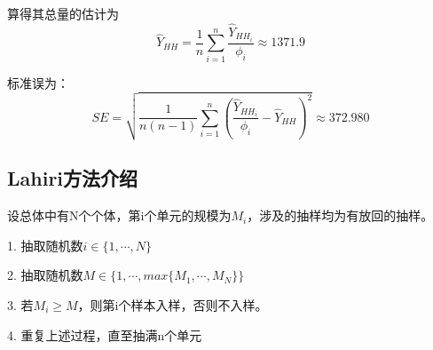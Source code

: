 \documentclass[a4paper,12pt]{article}
\begin{document}
	算得其总量的估计为$$\hat{Y}_{HH}=\frac{1}{n}\sum_{i=1}^{n}\frac{\hat{Y}_{HH_i}}{\phi_i}\approx 1371.9$$

	标准误为：$$SE=\sqrt{\frac{1}{n(n-1)}\sum_{i=1}^{n}(\frac{\hat{Y}_{HH_i}}{\phi_i}-\hat{Y}_{HH})^2} \approx 372.980$$
	\subsection{Lahiri方法介绍}
	设总体中有N个个体，第i个单元的规模为$M_i$，涉及的抽样均为有放回的抽样。

	1. 抽取随机数$i\in \{1,\cdots,N\}$

	2. 抽取随机数$M\in \{1,\cdots,max\{M_1,\cdots,M_N\}\}$

	3. 若$M_i\geq M$，则第i个样本入样，否则不入样。

	4. 重复上述过程，直至抽满n个单元
\end{document}
